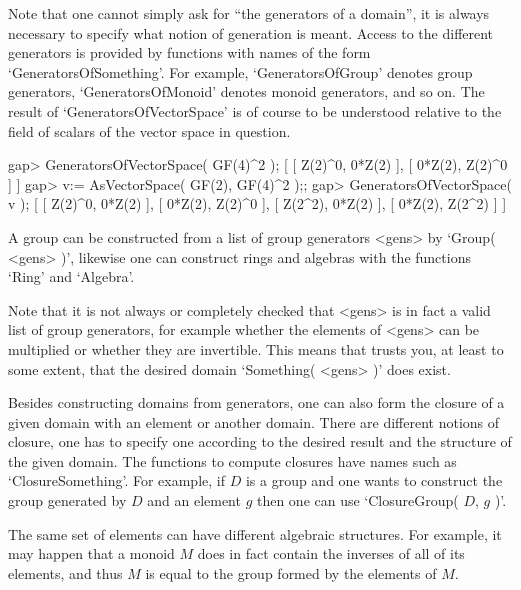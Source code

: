 Note that one cannot simply ask for ``the generators of a domain'',
it is always necessary to specify what notion of generation is meant.
Access to the different generators is provided by functions with
names of the form `GeneratorsOfSomething'.
For example, `GeneratorsOfGroup' denotes group generators,
`GeneratorsOfMonoid' denotes monoid generators, and so on.
The result of `GeneratorsOfVectorSpace' is of course to be understood
relative to the field of scalars of the vector space in question.

\beginexample
gap> GeneratorsOfVectorSpace( GF(4)^2 );
[ [ Z(2)^0, 0*Z(2) ], [ 0*Z(2), Z(2)^0 ] ]
gap> v:= AsVectorSpace( GF(2), GF(4)^2 );;
gap> GeneratorsOfVectorSpace( v );
[ [ Z(2)^0, 0*Z(2) ], [ 0*Z(2), Z(2)^0 ], [ Z(2^2), 0*Z(2) ],
  [ 0*Z(2), Z(2^2) ] ]
\endexample



A group can be constructed from a list of group generators <gens> by
`Group( <gens> )',
likewise one can construct rings and algebras with the functions `Ring'
and `Algebra'.

Note that it is not always or completely checked that <gens> is in
fact a valid list of group generators, for example whether the
elements of <gens> can be multiplied or whether they are invertible.
This means that {\GAP} trusts you, at least to some extent, that the
desired domain `Something( <gens> )' does exist.



Besides constructing domains from generators, one can also form the
closure of a given domain with an element or another domain.
There are different notions of closure, one has to specify one
according to the desired result and the structure of the given domain.
The functions to compute closures have names such as
`ClosureSomething'.
For example, if $D$ is a group and one wants to construct the group
generated by $D$ and an element $g$ then one can use
`ClosureGroup( $D$, $g$ )'.



The same set of elements can have different algebraic structures.
For example, it may happen that a monoid $M$ does in fact contain
the inverses of all of its elements, and thus $M$ is equal to the group
formed by the elements of $M$.

